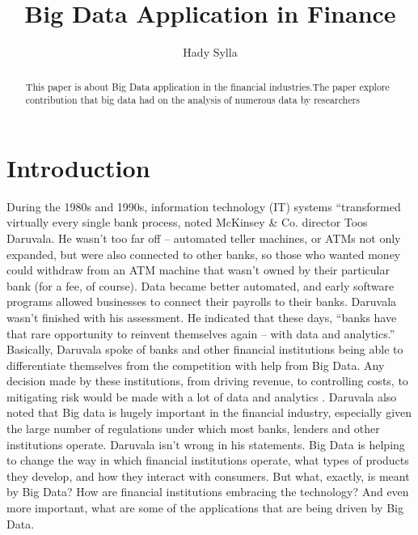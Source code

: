 \documentclass[sigconf]{acmart}
\begin{document}
\title{Big Data Application in Finance}


\author{Hady Sylla}


\renewcommand{\shortauthors}{G. v. Laszewski}


\begin{abstract}
This paper is about Big Data application in the financial industries.The paper explore contribution that big data had on the analysis of numerous data by researchers
\end{abstract}




\maketitle


\section{Introduction}

During the 1980s and 1990s, information technology (IT) systems “transformed virtually every single bank process, noted McKinsey \& Co. director Toos Daruvala. He wasn’t too far off – automated teller machines, or ATMs not only expanded, but were also connected to other banks, so those who wanted money could withdraw from an ATM machine that wasn’t owned by their particular bank (for a fee, of course). Data became better automated, and early software programs allowed businesses to connect their payrolls to their banks.
Daruvala wasn’t finished with his assessment. He indicated that these days, “banks have that rare opportunity to reinvent themselves again – with data and analytics.” Basically, Daruvala spoke of banks and other financial institutions being able to differentiate themselves from the competition with help from Big Data. Any decision made by these institutions, from driving revenue, to controlling costs, to mitigating risk would be made with a lot of data and analytics \cite{daruvala2013advanced}. Daruvala also noted that Big data is hugely important in the financial industry, especially given the large number of regulations under which most banks, lenders and other institutions operate. 
Daruvala isn’t wrong in his statements. Big Data is helping to change the way in which financial institutions operate, what types of products they develop, and how they interact with consumers. But what, exactly, is meant by Big Data? How are financial institutions embracing the technology? And even more important, what are some of the applications that are being driven by Big Data.
 
\end{document}

